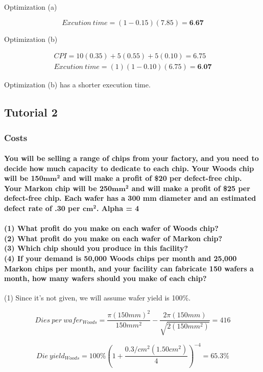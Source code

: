 \documentclass{article}
\begin{document}
Optimization (a)

$$
Excution\ time = (1-0.15)(7.85) = \textbf{6.67}
$$

Optimization (b)

$$
\begin{matrix}
CPI = 10(0.35) + 5(0.55) + 5(0.10) = 6.75 \\
Excution\ time = (1)(1-0.10)(6.75) = \textbf{6.07}
\end{matrix}
$$

Optimization (b) has a shorter execution time.

\subsection{Tutorial 2}

\subsubsection{Costs}

\paragraph{You will be selling a range of chips from your factory, and you need to decide how much
capacity to dedicate to each chip. Your Woods chip will be 150$\mathbf{mm^2}$ and will make a
profit of \$20 per defect-free chip. Your Markon chip will be 250$\mathbf{mm^2}$ and will make a
profit of \$25 per defect-free chip. Each wafer has a 300 mm diameter and an estimated 
defect rate of .30 per $\mathbf{cm^2}$. Alpha = 4 \\
\\(1) What profit do you make on each wafer of Woods chip?
\\(2) What profit do you make on each wafer of Markon chip?
\\(3) Which chip should you produce in this facility?
\\(4) If your demand is 50,000 Woods chips per month and 25,000 Markon chips per
month, and your facility can fabricate 150 wafers a month, how many wafers should you
make of each chip?}

(1)  Since it's not given, we will assume wafer yield is 100\%.

$$
Dies\ per\ wafer_{Woods} = \dfrac{\pi (150mm)^2}{150mm^2} - \dfrac{2\pi(150mm)}{\sqrt{2(150mm^2)}} = 416
$$

$$
Die\ yield_{Woods} = 100\% \left(1 + \dfrac{0.3/cm^2(1.50cm^2)}{4}\right)^{-4} = 65.3\%
$$
\end{document}
